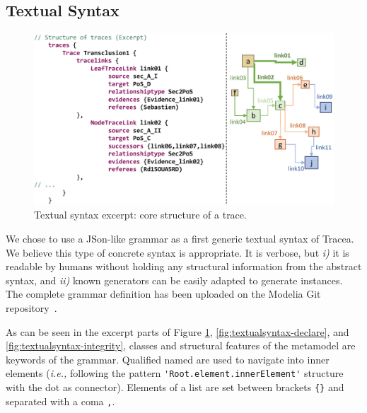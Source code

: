 \subsection{Textual Syntax}
\begin{figure}[h]
	\centering 
	\includegraphics[width=.95\linewidth]{images/listing-struct.pdf}
	\caption{Textual syntax excerpt: core structure of a trace.}
	\label{fig:textualsyntax-struct}
\end{figure}
We chose to use a JSon-like grammar as a first generic textual syntax of Tracea. We believe this type of concrete syntax is appropriate. It is verbose, but \textit{i)} it is readable by humans without holding any structural information from the abstract syntax, and \textit{ii)} known generators can be easily adapted to generate instances. The complete grammar definition has been uploaded on the Modelia Git repository~\cite{Tracea_Repo}.

As can be seen in the excerpt parts of Figure \ref{fig:textualsyntax-struct}, \ref{fig:textualsyntax-declare}, and \ref{fig:textualsyntax-integrity}, classes and structural features of the metamodel are keywords of the grammar. Qualified named are used to navigate into inner elements (\textit{i.e.,} following the pattern \verb|'Root.element.innerElement'| structure with the dot as connector). Elements of a list are set between brackets \verb|{}| and separated with a coma \verb|,|.


